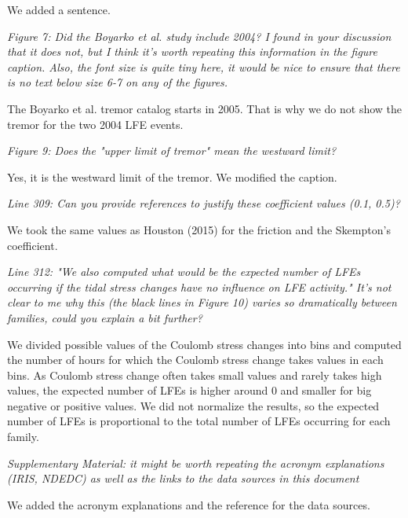 \documentclass[letterpaper, 12pt]{article}
\begin{document}
\bigskip

We added a sentence.

\bigskip

\textit{Figure 7: Did the Boyarko et al. study include 2004? I found in your discussion that it does not, but I think it's worth repeating this information in the figure caption. Also, the font size is quite tiny here, it would be nice to ensure that there is no text below size 6-7 on any of the figures.}

\bigskip

The Boyarko et al. tremor catalog starts in 2005. That is why we do not show the tremor for the two 2004 LFE events.

\bigskip

\textit{Figure 9: Does the "upper limit of tremor" mean the westward limit?}

\bigskip

Yes, it is the westward limit of the tremor. We modified the caption.

\bigskip

\textit{Line 309: Can you provide references to justify these coefficient values (0.1, 0.5)?}

\bigskip

We took the same values as Houston (2015) for the friction and the Skempton's coefficient.

\bigskip

\textit{Line 312: "We also computed what would be the expected number of LFEs occurring if the tidal stress changes have no influence on LFE activity." It's not clear to me why this (the black lines in Figure 10) varies so dramatically between families, could you explain a bit further?}

\bigskip

We divided possible values of the Coulomb stress changes into bins and computed the number of hours for which the Coulomb stress change takes values in each bins. As Coulomb stress change often takes small values and rarely takes high values, the expected number of LFEs is higher around 0 and smaller for big negative or positive values. We did not normalize the results, so the expected number of LFEs is proportional to the total number of LFEs occurring for each family.

\bigskip

\textit{Supplementary Material: it might be worth repeating the acronym explanations (IRIS, NDEDC) as well as the links to the data sources in this document}

\bigskip

We added the acronym explanations and the reference for the data sources.
\end{document}
